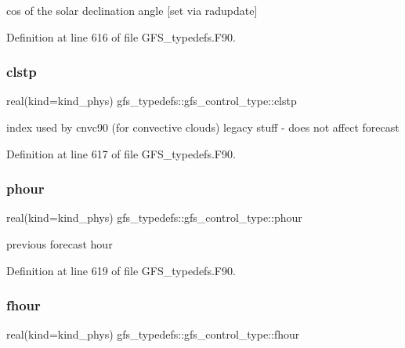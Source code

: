 cos of the solar declination angle [set via radupdate] 



Definition at line 616 of file G\+F\+S\+\_\+typedefs.\+F90.

\mbox{\label{structgfs__typedefs_1_1gfs__control__type_a21602325f00529c98e7119fdd4dacda7}} 
\subsubsection{clstp}
{\footnotesize\ttfamily real(kind=kind\+\_\+phys) gfs\+\_\+typedefs\+::gfs\+\_\+control\+\_\+type\+::clstp}



index used by cnvc90 (for convective clouds) legacy stuff -\/ does not affect forecast 



Definition at line 617 of file G\+F\+S\+\_\+typedefs.\+F90.

\mbox{\label{structgfs__typedefs_1_1gfs__control__type_aba6eb931d9a2105fb69c377936d708d6}} 
\subsubsection{phour}
{\footnotesize\ttfamily real(kind=kind\+\_\+phys) gfs\+\_\+typedefs\+::gfs\+\_\+control\+\_\+type\+::phour}



previous forecast hour 



Definition at line 619 of file G\+F\+S\+\_\+typedefs.\+F90.

\mbox{\label{structgfs__typedefs_1_1gfs__control__type_ab2644c1f9da5e6796f18095017b19ab7}} 
\subsubsection{fhour}
{\footnotesize\ttfamily real(kind=kind\+\_\+phys) gfs\+\_\+typedefs\+::gfs\+\_\+control\+\_\+type\+::fhour}




